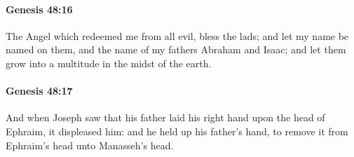 		\paragraph{Genesis 48:16} %
			\label{GENESIS-48-16}

			The Angel which redeemed me from all evil, bless the lads; and let my name be named on them, and the name of my fathers Abraham and Isaac; and let them grow into a multitude in the midst of the earth.


		\paragraph{Genesis 48:17} %
			\label{GENESIS-48-17}

			And when Joseph saw that his father laid his right hand upon the head of Ephraim, it displeased him: and he held up his father's hand, to remove it from Ephraim's head unto Manasseh's head.

